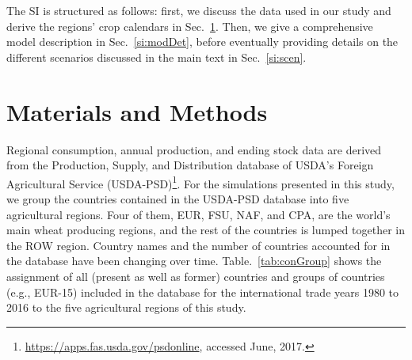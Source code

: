 The SI is structured as follows: first, we discuss the data used in our study and derive the regions' crop calendars in Sec.~\ref{si:MM}. Then, we give a comprehensive model description in Sec.~\ref{si:modDet}, before eventually providing details on the different scenarios discussed in the main text in Sec.~\ref{si:scen}.  

\section{Materials and Methods}
\label{si:MM}
Regional consumption, annual production, and ending stock data are derived from the Production,
Supply, and Distribution database of USDA's Foreign Agricultural Service
(USDA-PSD)\footnote{\url{https://apps.fas.usda.gov/psdonline}, accessed June, 2017.}.  For the
simulations presented in this study, we group the countries contained in the USDA-PSD database into
five agricultural regions. Four of them, EUR, FSU, NAF, and CPA, are the world's main wheat
producing regions, and the rest of the countries is lumped together in the ROW region. Country names
and the number of countries accounted for in the database have been changing over time.
Table.~\ref{tab:conGroup} shows the assignment of all (present as well as former) countries and
groups of countries (e.g., EUR-15) included in the database for the international trade years 1980
to 2016 to the five agricultural regions of this study.
